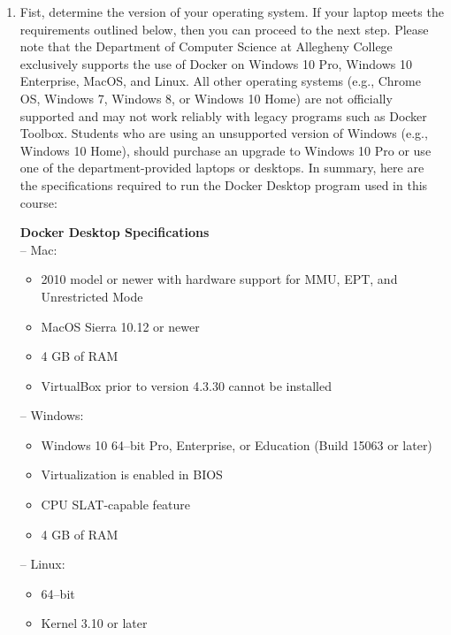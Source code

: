 \documentclass[11pt]{article}
\begin{document}
\begin{enumerate}

    \item Fist, determine the version of your operating system. If your laptop
      meets the requirements outlined below, then you can proceed to the next
      step. Please note that the Department of Computer Science at Allegheny
      College exclusively supports the use of Docker on Windows 10 Pro, Windows
      10 Enterprise, MacOS, and Linux. All other operating systems (e.g., Chrome
      OS, Windows 7, Windows 8, or Windows 10 Home) are not officially supported
      and may not work reliably with legacy programs such as Docker Toolbox.
      Students who are using an unsupported version of Windows (e.g., Windows 10
      Home), should purchase an upgrade to Windows 10 Pro or use one of the
      department-provided laptops or desktops. In summary, here are the
      specifications required to run the Docker Desktop program used in this
      course:

      \textbf{Docker Desktop Specifications} \\
      -- Mac: \vspace{-.1in}
      \begin{itemize}
        \setlength{\itemsep}{0in}
        \item 2010 model or newer with hardware support for MMU, EPT, and Unrestricted Mode
        \item MacOS Sierra 10.12 or newer
        \item 4 GB of RAM
        \item VirtualBox prior to version 4.3.30 cannot be installed
      \end{itemize}
      -- Windows: \vspace{-.1in}
      \begin{itemize}
        \item Windows 10 64--bit Pro, Enterprise, or Education (Build 15063 or later)
        \item Virtualization is enabled in BIOS
        \item CPU SLAT-capable feature
        \item 4 GB of RAM
      \end{itemize}
      -- Linux: \vspace{-.1in}
      \begin{itemize}
        \item 64--bit
        \item Kernel 3.10 or later
      \end{itemize}


\end{enumerate}
\end{document}
